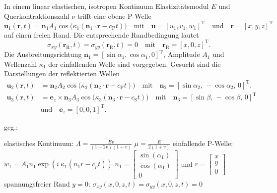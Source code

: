 



In einem linear elastischen, isotropen Kontinuum Elastizitätsmodul $E$ und Querkontraktionszahl $\nu$ trifft eine ebene P-Welle
\begin{equation*}
    \mathbf{u}_1(\mathbf{r},t)=\mathbf{n}_1 A_1 \cos\bigl(\kappa_1 (\mathbf{n}_1\cdot \mathbf{r}-c_\mathrm{P}t)\bigr) 
    \quad \text{mit} \quad
    \mathbf{u}={[u_1,v_1,w_1]}^\mathrm{T}
    \quad \text{und} \quad
    \mathbf{r}={[x,y,z]}^\mathrm{T}
\end{equation*}
auf einen freien Rand. Die entsprechende Randbedingung lautet
\begin{equation*}
    \sigma_{xy}(\mathbf{r}_\mathrm{R},t) = \sigma_{yy}(\mathbf{r}_\mathrm{R},t) = 0
    \quad \text{mit} \quad
    \mathbf{r}_\mathrm{R}={ [x,0,z] }^\mathrm{T}. 
\end{equation*}
Die Ausbreitungsrichtung $\mathbf{n}_1=[\sin\alpha_1, \cos\alpha_1, 0]^\mathrm{T}$, Amplitude $A_1$ und Wellenzahl $\kappa_1$ der einfallenden Welle sind vorgegeben.
Gesucht sind die Darstellungen der reflektierten Wellen
\begin{align*}
    \mathbf{u}_2(\mathbf{r},t) &= \mathbf{n}_2 A_2 \cos\bigl(\kappa_2 (\mathbf{n}_2\cdot \mathbf{r}-c_\mathrm{P}t)\bigr)
    \quad \text{mit} \quad
    \mathbf{n}_2=[\sin\alpha_2,\, -\cos\alpha_2,\, 0]^\mathrm{T}, \\
    \mathbf{u}_3(\mathbf{r},t) &= \mathbf{e}_z\times\mathbf{n}_3 A_3 \cos\bigl(\kappa_3 (\mathbf{n}_3\cdot \mathbf{r}-c_\mathrm{S}t)\bigr)
    \quad \text{mit} \quad 
    \mathbf{n}_3=[\sin\beta,\, -\cos\beta,\, 0]^\mathrm{T} \\
    &\text{und} \quad
    \mathbf{e}_z={[0,0,1]}^\mathrm{T}.
\end{align*}


\begin{minipage}[t]{\linewidth}
    geg.:
    \begin{tasks}
        \task[] elastisches Kontinuum:
        \task[] $\Lambda = \frac{E v}{(1-2v)(1+v)}$ \qquad $\mu = \frac{E}{2(1+v)}$ 
        \task[] einfallende P-Welle:
        \task[] $w_1 = A_1 n_1 \exp(i \ \kappa_1(n_1 r-c_p t))$ \qquad {} $n_1 = 
                \begin{bmatrix}
                    \sin(\alpha_1) \\
                    \cos(\alpha_1) \\
                    0
                \end{bmatrix}$ und $r = \begin{bmatrix}
                    x \\ y \\ 0
                \end{bmatrix}$
        \task[] spannungsfreier Rand $y = 0$:
        \task[] $\sigma_{xy} (x,0,z,t) = \sigma_{yy} (x,0,z,t) = 0$
    \end{tasks}
\end{minipage}

